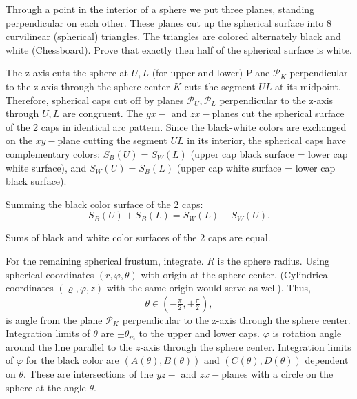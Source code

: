 \documentclass[12pt,a4paper]{memoir}
\theoremstyle{definition}
\begin{document}
\begin{question}[name={Hanging Sector by Atan}]
	Through a point in the interior of a sphere we put three planes, standing perpendicular on each other. These planes cut up the spherical surface into 8 curvilinear (spherical) triangles. The triangles are colored alternately black and white (Chessboard). Prove that exactly then half of the spherical surface is white.
\end{question}





\begin{solution}[name={Solution by Yetti}] 
	The z-axis cuts the sphere at $ U, L$ (for upper and lower) Plane $ \mathcal P_K$ perpendicular to the z-axis through the sphere center $ K$ cuts the segment $ UL$ at its midpoint. Therefore, spherical caps cut off by planes $ \mathcal P_U, \mathcal P_L$ perpendicular to the z-axis through $ U, L$ are congruent. The $yx-$ and $zx-$planes cut the spherical surface of the 2 caps in identical arc pattern. Since the black-white colors are exchanged on the $xy-$plane cutting the segment $ UL$ in its interior, the spherical caps have complementary colors: $ S_B(U) = S_W(L)$ (upper cap black surface = lower cap white surface), and $ S_W(U) = S_B(L)$ (upper cap white surface = lower cap black surface).
	
	Summing the black color surface of the 2 caps: \[S_B(U) + S_B(L) = S_W(L) + S_W(U).\]
	
	Sums of black and white color surfaces of the 2 caps are equal.
	
	For the remaining spherical frustum, integrate. $ R$ is the sphere radius. Using spherical coordinates $ (r, \varphi, \theta)$ with origin at the sphere center. (Cylindrical coordinates $ (\varrho, \varphi, z)$ with the same origin would serve as well). Thus, $$ \theta \in ( - \frac {_{\pi}}{^2}, + \frac {_{\pi}}{^2}),$$ is angle from the plane $ \mathcal P_K$ perpendicular to the z-axis through the sphere center. Integration limits of $ \theta$ are $ \pm \theta_m$ to the upper and lower caps. $ \varphi$ is rotation angle around the line parallel to the $z$-axis through the sphere center. Integration limits of $ \varphi$ for the black color are $ (A(\theta), B(\theta))$ and $ (C(\theta), D(\theta))$ dependent on $ \theta.$ These are intersections of the $yz-$ and $zx-$planes with a circle on the sphere at the angle $ \theta.$
	

\end{solution}
\end{document}
